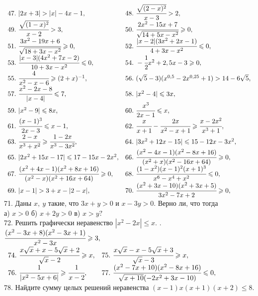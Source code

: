 \documentclass[12pt]{article}
\begin{document}
$\begin{array}{ll}
47.\ |2x+3|>|x|-4x-1,&
48.\ \cfrac{\sqrt{(2-x)^2}}{x-3}>2,\\
49.\ \cfrac{\sqrt{(1-x)^2}}{x-2}>3,&
50.\ \cfrac{2x^2-15x+7}{\sqrt{14+5x-x^2}}\geqslant0,\\
51.\ \cfrac{3x^2-19x+6}{\sqrt{18+3x-x^2}}\geqslant0,&
52.\ \cfrac{|x-2|(3x^2+2x-1)}{4+3x-x^2}\leqslant0,\\
53.\ \cfrac{|x-3|(4x^2+7x-2)}{10+3x-x^2}\leqslant0,&
54.\ -\cfrac{1}{2}x^2+2,5x-3\geqslant0,\\
55.\ \cfrac{4}{x^2-x-6}\geqslant(2+x)^{-1},&
56.\ (\sqrt{5}-3)(x^{0,5}-2x^{0,25}+1)>14-6\sqrt{5},\\
57.\ \cfrac{x^2-2x-8}{|x-4|}\leqslant 7,&
58.\ |x^2-4|\leqslant3x,\\
59.\ |x^2-9|\leqslant8x,&
60.\ \cfrac{x^3}{2x-1}\leqslant x,\\
61.\ \cfrac{(x-1)^3}{2x-3}\leqslant x-1,&
62.\ \cfrac{x}{x+1}-\cfrac{2x}{x^2-x+1}\geqslant\cfrac{x-2x^2}{x^3+1},\\
63.\ \cfrac{2-x}{x^3+x^2}\geqslant\cfrac{1-2x}{x^3-3x^2},&
64.\ |3x^2+12x-15|\leqslant15-12x-3x^2,\\
65.\ |2x^2+15x-17|\leqslant17-15x-2x^2,&
66.\ \cfrac{(x^2-4x-1)(x^2-8x+16)}{(x^2+x)(x^2-16x+64)}\geqslant0,\\
67.\ \cfrac{(x^2+4x-1)(x^2+8x+16)}{(x^2-x)(x^2+16x+64)}\geqslant0,&
68.\ \cfrac{(1-x^2)(x-1)^2(x+1)^3}{x^6-x^4+x^2}\leqslant0,\\
69.\ |x-1|>3+x-|2-x|,&
70.\ \cfrac{(x^2+3x-10)(x^2+3x+5)}{3x^2-7x+2}\geqslant0,
\end{array}$\\
71. Даны $x,\ y$ такие, что $3x+y>0$ и $x-3y>0.$ Верно ли, что тогда\\
а) $x>0$ б) $x+2y>0$ в) $x>y?$\\
72. Решить графически неравенство $|x^2-2x|\leqslant x.$ . $\cfrac{(x^2-3x+8)(x^2-3x+1)}{x^2-3x}\geqslant3,$\\
$\begin{array}{ll}
74.\ \cfrac{x\sqrt{x}+x-5\sqrt{x}+2}{\sqrt{x}-2}\geqslant x,&
75.\ \cfrac{x\sqrt{x}-x-5\sqrt{x}+3}{\sqrt{x}-3}\geqslant x,\\
76.\ \cfrac{1}{|x^2-5x+6|}\geqslant \cfrac{1}{x-2},&
77.\ \cfrac{(x^2-7x+10)(x^2-8x+16)}{\sqrt{x+10}(-2x^2+3x-10)}\leqslant 0,
\end{array}$\\
78. Найдите сумму целых решений неравенства $(x-1)x(x+1)(x+2)\leqslant8.$\\
\end{document}
